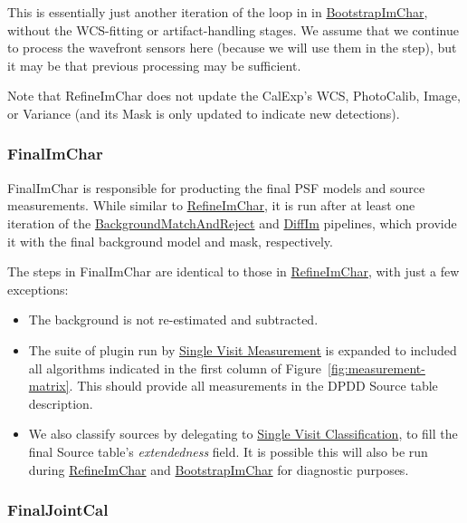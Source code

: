 This is essentially just another iteration of the loop in in \hyperref[sec:drpBootstrapImChar]{BootstrapImChar}, without the WCS-fitting or artifact-handling stages.  We assume that we continue to process the wavefront sensors here (because we will use them in the  step), but it may be that previous processing may be sufficient.

Note that RefineImChar does not update the CalExp's WCS, PhotoCalib, Image, or Variance (and its Mask is only updated to indicate new detections).


\let\hr\undefined

\subsubsection{FinalImChar}
\label{sec:drpFinalImChar}

FinalImChar is responsible for producting the final PSF models and source measurements.  While similar to \hyperref[sec:drpRefineImChar]{RefineImChar}, it is run after at least one iteration of the \hyperref[sec:drpBackgroundMatchAndReject]{BackgroundMatchAndReject} and \hyperref[sec:drpDiffIm]{DiffIm} pipelines, which provide it with the final background model and mask, respectively.

The steps in FinalImChar are identical to those in \hyperref[sec:drpRefineImChar]{RefineImChar}, with just a few exceptions:

\begin{itemize}
\item The background is not re-estimated and subtracted.
\item The suite of plugin run by \hyperref[sec:acSingleVisitMeasurement]{Single Visit Measurement} is expanded to included all algorithms indicated in the first column of Figure~\ref{fig:measurement-matrix}.  This should provide all measurements in the DPDD Source table description.
\item We also classify sources by delegating to \hyperref[sec:acSingleVisitClassification]{Single Visit Classification}, to fill the final Source table's \emph{extendedness} field.  It is possible this will also be run during \hyperref[sec:drpRefineImChar]{RefineImChar} and \hyperref[sec:drpBootstrapImChar]{BootstrapImChar} for diagnostic purposes.
\end{itemize}

\subsubsection{FinalJointCal}
\label{sec:drpFinalJointCal}

